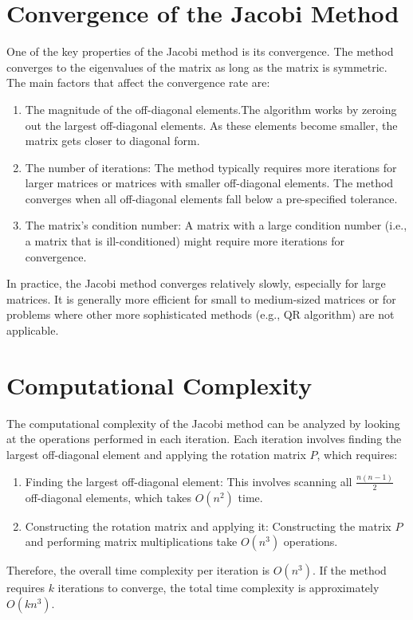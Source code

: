 \documentclass[journal]{IEEEtran}
\begin{document}
\section{Convergence of the Jacobi Method}

One of the key properties of the Jacobi method is its convergence. The method converges to the eigenvalues of the matrix as long as the matrix is symmetric. The main factors that affect the convergence rate are:
\begin{enumerate}
    \item The magnitude of the off-diagonal elements.The algorithm works by zeroing out the largest off-diagonal elements. As these elements become smaller, the matrix gets closer to diagonal form.
    \item The number of iterations: The method typically requires more iterations for larger matrices or matrices with smaller off-diagonal elements. The method converges when all off-diagonal elements fall below a pre-specified tolerance.
    \item The matrix's condition number: A matrix with a large condition number (i.e., a matrix that is ill-conditioned) might require more iterations for convergence.
\end{enumerate}

In practice, the Jacobi method converges relatively slowly, especially for large matrices. It is generally more efficient for small to medium-sized matrices or for problems where other more sophisticated methods (e.g., QR algorithm) are not applicable.


\section{Computational Complexity}

The computational complexity of the Jacobi method can be analyzed by looking at the operations performed in each iteration. Each iteration involves finding the largest off-diagonal element and applying the rotation matrix $P$, which requires:
\begin{enumerate}
 \item Finding the largest off-diagonal element: This involves scanning all $\frac{n(n-1)}{2}$ off-diagonal elements, which takes $O(n^2)$ time.
 \item Constructing the rotation matrix and applying it: Constructing the matrix $P$ and performing matrix multiplications take $O(n^3)$ operations.
\end{enumerate}
Therefore, the overall time complexity per iteration is $O(n^3)$. If the method requires $k$ iterations to converge, the total time complexity is approximately $O(k n^3)$.
\end{document}
